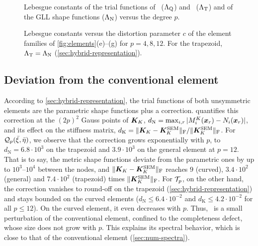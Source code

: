\begin{figure}[htbp]
  \centering
  
  \caption{Lebesgue constants of the trial functions of \PM\ ($\Lambda_{\mathrm{Q}}$) and \PH\ ($\Lambda_{\mathrm{T}}$) and of the GLL shape functions ($\Lambda_{\mathrm{N}}$) versus the degree $p$.}
  \label{fig:lebesgue}
\end{figure}

\begin{figure}[htbp]
  \centering
  
  \caption{Lebesgue constants versus the distortion parameter $c$ of the element families of \cref{fig:elements}(e)--(g) for $p=4,8,12$. For the trapezoid, $\Lambda_{\mathrm{T}}=\Lambda_{\mathrm{N}}$ (\cref{sec:hybrid-representation}).}
  \label{fig:sweep}
\end{figure}
%
\subsection{Deviation from the conventional element}
\label{sec:num-deviation}
%
According to \cref{sec:hybrid-representation}, the trial functions of both unsymmetric elements are the parametric shape functions plus a correction.  quantifies this correction at the $(2p)^2$ Gauss points of $\bm{K}_K$, $d_{\mathrm{N}}=\max_{i,r}|M_i^K(\bm{x}_r)-N_i(\bm{x}_r)|$, and its effect on the stiffness matrix, $d_{\mathrm{K}}=\|\bm{K}_K-\bm{K}_K^{\text{SEM}}\|_{\mathrm{F}}/\|\bm{K}_K^{\text{SEM}}\|_{\mathrm{F}}$. For $\mathcal Q_p(\bar\xi,\bar\eta)$, we observe that the correction grows exponentially with $p$, to $d_{\mathrm{N}}=6.8\cdot10^{3}$ on the trapezoid and $3.9\cdot10^{3}$ on the general element at $p=12$. That is to say, the metric shape functions deviate from the parametric ones by up to $10^{3}$--$10^{4}$ between the nodes, and $\|\bm{K}_K-\bm{K}_K^{\text{SEM}}\|_{\mathrm{F}}$ reaches $9$ (curved), $3.4\cdot10^{2}$ (general) and $7.4\cdot10^{2}$ (trapezoid) times $\|\bm{K}_K^{\text{SEM}}\|_{\mathrm{F}}$. For $\mathcal T_p$, on the other hand, the correction vanishes to round-off on the trapezoid (\cref{sec:hybrid-representation}) and stays bounded on the curved elements ($d_{\mathrm{N}}\le6.4\cdot10^{-2}$ and $d_{\mathrm{K}}\le4.2\cdot10^{-2}$ for all $p\le12$). On the curved element, it even decreases with $p$. Thus, \PH\ is a small perturbation of the conventional element, confined to the completeness defect, whose size does not grow with $p$. This explains its spectral behavior, which is close to that of the conventional element (\cref{sec:num-spectra}).

